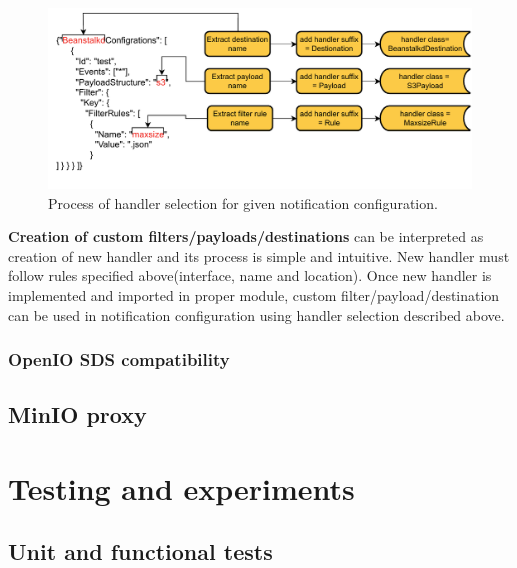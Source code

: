     \begin{figure}[H]
        \centering
        \includegraphics[width=1\textwidth]{obrazky-figures/enoss-handler-selection.pdf}
        \caption{Process of handler selection for given notification configuration.}
        \label{fig:enoss-handler-selection}
    \end{figure}

    \textbf{Creation of custom filters/payloads/destinations} can be interpreted as creation of new handler and its process is simple and intuitive. New handler must follow rules specified above(interface, name and location). Once new handler is implemented and imported in proper module, custom filter/payload/destination can be used in notification configuration using handler selection described above.

    \subsection{OpenIO SDS compatibility}
    \textcolor{gray}{\blindtext}

    \textcolor{gray}{\blindtext}

\section{MinIO proxy}
    \textcolor{gray}{\blindtext}

    \textcolor{gray}{\blindtext}

    \textcolor{gray}{\blindtext}

    \textcolor{gray}{\blindtext}


\chapter{Testing and experiments}
    \textcolor{gray}{\blindtext}

\section{Unit and functional tests}
    \textcolor{gray}{\blindtext}

